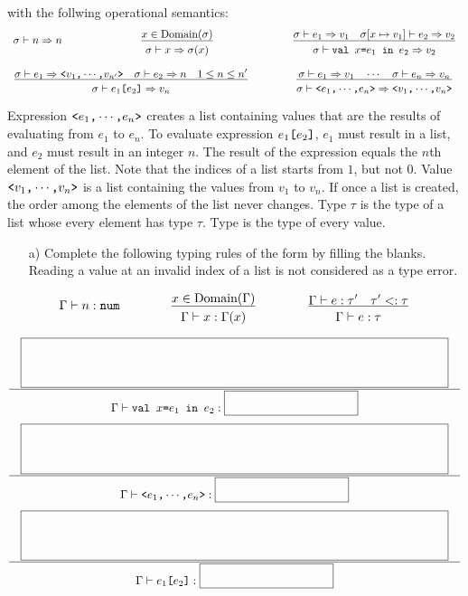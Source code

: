 \begin{enumerate}
with the follwing operational semantics:
\[
\begin{array}{ccccc}
\sigma\vdash n\Rightarrow n
&\qquad&
\newinfrule
{ x\in\mbox{Domain}(\sigma) }
{ \sigma\vdash x\Rightarrow\sigma(x) }
&\qquad&
\newinfrule
{ \sigma\vdash e_1\Rightarrow v_1 \rulesep
  \sigma[x\mapsto v_1]\vdash e_2\Rightarrow v_2 }
{ \sigma\vdash \code{val }x\code{=}e_1\code{ in }e_2\Rightarrow v_2 }
\\[20pt]
\multicolumn{3}{c}{
\newinfrule
{ \sigma\vdash e_1\Rightarrow \code{<}v_1\code{,}\cdots\code{,}v_{n'}\code{>} \rulesep
   \sigma\vdash e_2\Rightarrow n \rulesep
   1\le n\le n' }
{ \sigma\vdash e_1\code{[}e_2\code{]} \Rightarrow v_n }
}
&\qquad&
\newinfrule
{ \sigma\vdash e_1\Rightarrow v_1\rulesep\cdots\rulesep \sigma\vdash e_n\Rightarrow v_n }
{ \sigma\vdash\code{<}e_1\code{,}\cdots\code{,}e_n\code{>} \Rightarrow
   \code{<}v_1\code{,}\cdots\code{,}v_n\code{>} }
\\
\end{array}
\]

Expression $\verb+<+e_1\verb+,+\cdots\verb+,+e_n\verb+>+$ creates a list containing
values that are the results of evaluating from $e_1$ to $e_n$.
To evaluate expression $e_1\verb+[+e_2\verb+]+$, $e_1$ must result in a list, and
$e_2$ must result in an integer $n$. The result of the expression equals the $n$th
element of the list. Note that the indices of a list starts from $1$, but not $0$.
Value $\verb+<+v_1\verb+,+\cdots\verb+,+v_n\verb+>+$ is a list containing the values 
from $v_1$ to $v_n$. If once a list is created, the order among the elements of the list never changes.
Type \code{[}$\tau$\code{]} is the type of a list whose every element has type $\tau$.
Type  is the type of every value.

\begin{itemize}
\item[a)] Complete the following typing rules
of the form 
by filling the blanks.
Reading a value at an invalid index of a list is not considered
as a type error.
\end{itemize}

\[
\begin{array}{ccccc}
\typed{n}{\code{num}}
&\qquad&
\newinfrule
{ x\in\mbox{Domain}(\Gamma) }
{ \typed{x}{\Gamma(x)} }
&\qquad&
\newinfrule
{ \typed{e}{\tau'} \rulesep {\tau'}<:{\tau} }
{ \typed{e}{\tau} }
\end{array}
\]

{
\[
\newinfrule
{ \lblank }
{ \typed{\code{val }x\code{=}e_1\code{ in }e_2}{\sblank} }
\]
\[
\newinfrule
{ \lblank }
{ \typed{\code{<}e_1\code{,}\cdots\code{,}e_n\code{>}}{\sblank} }
\]
\[
\newinfrule
{ \lblank }
{ \typed{e_1\code{[}e_2\code{]}}{\sblank} }
\]
}


\end{enumerate}
